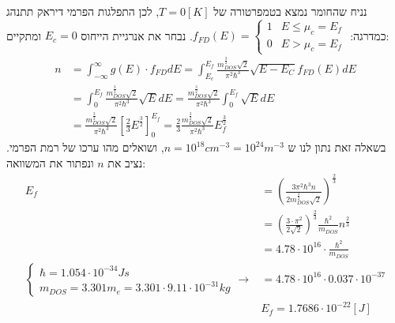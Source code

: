 \documentclass{article}
\begin{document}
\begin{Answer}
\begin{equation}
\end{equation}
נניח שהחומר נמצא בטמפרטורה של $T=0[K]$, לכן התפלגות הפרמי דיראק תתנהג כמדרגה: $f_{FD}{(E)}=\begin{cases}
    1 & E\leq \mu_c=E_{f}\\
    0 & E>\mu_c=E_{f}
\end{cases}$. נבחר את אנרגיית הייחוס $E_c=0$ ומתקיים:
\begin{align*}
    n&=\int_{-\infty}^{\infty}g(E)\cdot f_{FD}dE=\int_{E_{c}}^{E_{f}}
    \frac{m_{DOS}^{\frac{3}{2}}\sqrt{2}}{\pi^{2}\hbar^{3}}\sqrt{E-E_{C}}f_{FD}{(E)}dE\\
    &=\int_{0}^{E_{f}}\frac{m_{DOS}^{\frac{3}{2}}\sqrt{2}}{\pi^{2}\hbar^{3}}\sqrt{E}dE
    =\frac{m_{DOS}^{\frac{3}{2}}\sqrt{2}}{\pi^{2}\hbar^{3}}\int_{0}^{E_{f}}\sqrt{E}dE\\
    &=\frac{m_{DOS}^{\frac{3}{2}}\sqrt{2}}{\pi^{2}\hbar^{3}}\left[ \frac{2}{3}E^{\frac{3}{2}} \right]_{0}^{E_{f}}=\frac{2}{3}\frac{m_{DOS}^{\frac{3}{2}}\sqrt{2}}{\pi^{2}\hbar^{3}}E_{f}^{\frac{3}{2}}
\end{align*}
בשאלה זאת נתון לנו ש $n=10^{18}cm^{-3} = 10^{24}m^{-3}$, ושואלים מהו ערכו של רמת הפרמי. נציב את $n$ ונפתור את המשוואה:
\begin{align*}
    E_{f}&=\left( \frac{3\pi^{2}\hbar^{3}n}{2m_{DOS}^{\frac{3}{2}}\sqrt{2}} \right)^{\frac{2}{3}}\\
    &=\left( \frac{3\cdot \pi^{2}}{2\sqrt{2}} \right)^{\frac{2}{3}}\frac{\hbar^2}{m_{DOS}}n^{\frac{2}{3}}\\
    &=4.78\cdot10^{16}\cdot \frac{\hbar^2}{m_{DOS}}\\
    \begin{cases}
        \hbar=1.054\cdot 10^{-34}Js\\
        m_{DOS}=3.301m_{e}=3.301\cdot 9.11\cdot 10^{-31}kg
    \end{cases}\rightarrow &=4.78\cdot10^{16}\cdot0.037\cdot10^{-37}\\
    &\boxed{E_{f}=1.7686 \cdot 10^{-22}[J]}
\end{align*}
\end{Answer}
\end{document}
